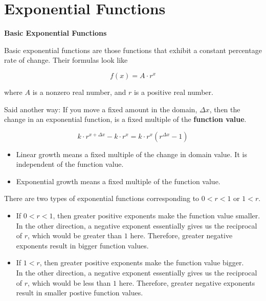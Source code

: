 \documentclass{ximera}
\begin{document}
\section*{Exponential Functions}


\begin{definition} \textbf{\textcolor{green!50!black}{Basic Exponential Functions}}

Basic exponential functions are those functions that exhibit a constant percentage rate of change.  Their formulas look like


\[      f(x) = A \cdot r^x   \]

where $A$ is a nonzero real number, and $r$ is a positive real number.


\end{definition}



Said another way:  If you move a fixed amount in the domain, $\Delta x$, then the change in an exponential function, is a fixed multiple of the \textbf{function value}.


\[
k \cdot r^{x + \Delta x} - k \cdot r^x = k \cdot r^x (r^{\Delta x} - 1)
\]

\begin{itemize}
\item Linear growth means a fixed multiple of the change in domain value. It is independent of the function value.
\item Exponential growth means a fixed multiple of the function value. 
\end{itemize}





There are two types of exponential functions corresponding to $0<r<1$ or $1<r$.






\begin{itemize}
\item If $0<r<1$, then greater positive exponents make the function value smaller.   \\
In the other direction, a negative exponent essentially gives us the reciprocal of $r$, which would be greater than $1$ here.  Therefore, greater negative exponents result in bigger function values. \\

\item If $1<r$, then greater positive exponents make the function value bigger.   \\ 
In the other direction, a negative exponent essentially gives us the reciprocal of $r$, which would be less than $1$ here.  Therefore, greater negative exponents result in smaller postive function values.
\end{itemize}
\end{document}
